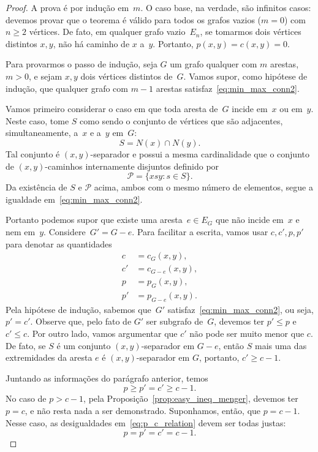 \documentclass[12pt, a4paper]{article}
\theoremstyle{definition}
\begin{document}
\begin{proof}
  A prova é por indução em~$m$. O caso base, na verdade, são infinitos casos: devemos provar que o teorema é válido para todos os grafos vazios ($m = 0$) com $n \geq 2$ vértices. De fato, em qualquer grafo vazio~$E_n$, se tomarmos dois vértices distintos $x,y$, não há caminho de $x$ a~$y$. Portanto, $p(x,y) = c(x,y) = 0$.

Para provarmos o passo de indução, seja $G$ um grafo qualquer com $m$ arestas, $m > 0$, e sejam $x,y$ dois vértices distintos de~$G$. Vamos supor, como hipótese de indução, que qualquer grafo com $m - 1$ arestas satisfaz~\eqref{eq:min_max_conn2}.

Vamos primeiro considerar o caso em que toda aresta de~$G$ incide em~$x$ ou em~$y$. Neste caso, tome $S$ como sendo o conjunto de vértices que são adjacentes, simultaneamente, a~$x$ e a~$y$ em~$G$:
\[ S = N(x) \cap N(y). \]
 Tal conjunto é $(x,y)$-separador e possui a mesma cardinalidade que o conjunto de $(x,y)$-caminhos internamente disjuntos definido por
\[ \mathcal{P} = \{xsy \colon s \in S\}. \]
Da existência de $S$ e $\mathcal{P}$ acima, ambos com o mesmo número de elementos, segue a igualdade em~\eqref{eq:min_max_conn2}.

Portanto podemos supor que existe uma aresta~$e \in E_G$ que não incide em~$x$ e nem em~$y$. Considere~$G' = G - e$.  Para facilitar a escrita, vamos usar $c,c',p,p'$ para denotar as quantidades
\begin{align*}
  c &= c_G(x,y),\\
  c' &= c_{G-e}(x,y),\\
  p &= p_G(x,y),\\
  p' &= p_{G-e}(x,y).
\end{align*}
Pela hipótese de indução, sabemos que~$G'$ satisfaz~\eqref{eq:min_max_conn2}, ou seja, $p' = c'$. Observe que, pelo fato de $G'$ ser subgrafo de~$G$, devemos ter $p'\leq p$ e $c'\leq c$. Por outro lado, vamos argumentar que $c'$ não pode ser muito menor que $c$. De fato, se $S$ é um conjunto $(x,y)$-separador em $G-e$, então $S$ mais uma das extremidades da aresta $e$ é $(x,y)$-separador em $G$, portanto, $c' \geq c - 1$. %

Juntando as informações do parágrafo anterior, temos
\begin{equation}
  \label{eq:p_c_relation}
   p \geq p' = c' \geq c - 1.
\end{equation}
No caso de $p > c - 1$, pela Proposição~\ref{prop:easy_ineq_menger}, devemos ter $p = c$, e não resta nada a ser demonstrado. Suponhamos, então, que $p = c - 1$. Nesse caso, as desigualdades em~\eqref{eq:p_c_relation} devem ser todas justas:
\[ p = p' = c' = c - 1.\]


\end{proof}
\end{document}
